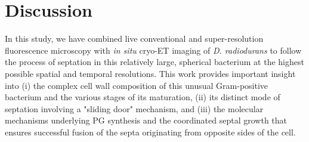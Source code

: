 \FloatBarrier

\section{Discussion}

In this study, we have combined live conventional and super-resolution fluorescence microscopy with \textit{in situ} cryo-ET imaging of \textit{D. radiodurans} to follow the process of septation in this relatively large, spherical bacterium at the highest possible spatial and temporal resolutions.
This work provides important insight into (i) the complex cell wall composition of this unusual Gram-positive bacterium and the various stages of its maturation, (ii) its distinct mode of septation involving a "sliding door" mechanism, and (iii) the molecular mechanisms underlying PG synthesis and the coordinated septal growth that ensures successful fusion of the septa originating from opposite sides of the cell.

